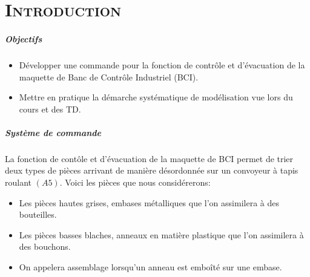 \chapter*{\textsc{Introduction}}
	
	\paragraph{Objectifs}
	\begin{itemize} [label=,font=\small \color{black}]
	\item Développer une commande pour la fonction de contrôle et d’évacuation de la maquette de Banc de Contrôle Industriel (BCI).
	\item Mettre en pratique la démarche systématique de modélisation vue lors du cours et des TD.
	\end{itemize}
	
	\paragraph{Système de commande\\}

	La fonction de contôle et d'évacuation de la maquette de BCI permet de trier deux types de pièces arrivant de manière désordonnée sur un convoyeur à tapis roulant $(A5)$. Voici les pièces que nous considérerons:  
	\begin{itemize} [label=,font=\small \color{black}]
	\item Les pièces hautes grises, embases métalliques que l'on assimilera à des bouteilles.
	\item Les pièces basses blaches, anneaux en matière plastique que l'on assimilera à des bouchons.
	\item On appelera assemblage lorsqu'un anneau est emboîté sur une embase.\\ 
	\end{itemize}
	
